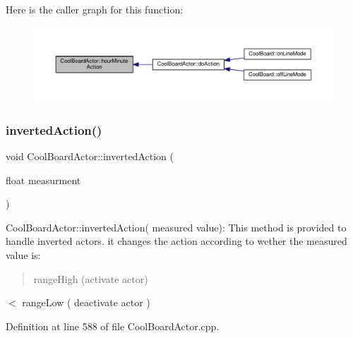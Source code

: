 Here is the caller graph for this function\+:\nopagebreak
\begin{figure}[H]
\begin{center}
\leavevmode
\includegraphics[width=350pt]{dc/d69/class_cool_board_actor_a1eb1fbca19bc80aad20d2686d52317f8_icgraph}
\end{center}
\end{figure}
\mbox{\label{class_cool_board_actor_aae82b2e62f91be009d40f93c206f9bda}} 
\subsubsection{\texorpdfstring{inverted\+Action()}{invertedAction()}}
{\footnotesize\ttfamily void Cool\+Board\+Actor\+::inverted\+Action (\begin{DoxyParamCaption}\item[{float}]{measurment }\end{DoxyParamCaption})}

Cool\+Board\+Actor\+::inverted\+Action( measured value)\+: This method is provided to handle inverted actors. it changes the action according to wether the measured value is\+: \begin{quote}
range\+High (activate actor) \end{quote}
$<$ range\+Low ( deactivate actor ) 

Definition at line 588 of file Cool\+Board\+Actor.\+cpp.


